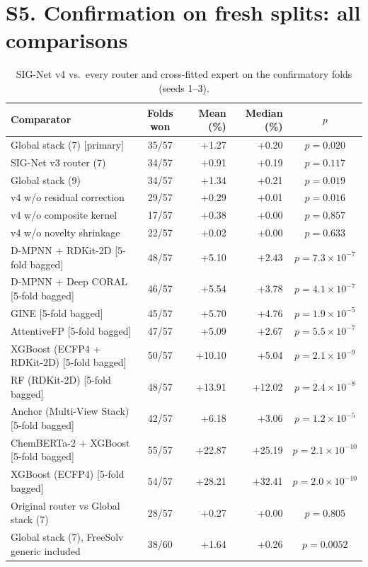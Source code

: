 \documentclass[11pt]{article}
\begin{document}
\section*{S5. Confirmation on fresh splits: all comparisons}
{\small
\begin{longtable}{lcrrc}
\caption{SIG-Net v4 vs.\ every router and cross-fitted expert on the confirmatory folds (seeds 1--3).}\\
\toprule
Comparator & Folds won & Mean (\%) & Median (\%) & $p$ \\
\midrule
Global stack (7) [primary] & 35/57 & +1.27 & +0.20 & $p = 0.020$ \\
SIG-Net v3 router (7) & 34/57 & +0.91 & +0.19 & $p = 0.117$ \\
Global stack (9) & 34/57 & +1.34 & +0.21 & $p = 0.019$ \\
v4 w/o residual correction & 29/57 & +0.29 & +0.01 & $p = 0.016$ \\
v4 w/o composite kernel & 17/57 & +0.38 & +0.00 & $p = 0.857$ \\
v4 w/o novelty shrinkage & 22/57 & +0.02 & +0.00 & $p = 0.633$ \\
D-MPNN + RDKit-2D [5-fold bagged] & 48/57 & +5.10 & +2.43 & $p = 7.3 \times 10^{-7}$ \\
D-MPNN + Deep CORAL [5-fold bagged] & 46/57 & +5.54 & +3.78 & $p = 4.1 \times 10^{-7}$ \\
GINE [5-fold bagged] & 45/57 & +5.70 & +4.76 & $p = 1.9 \times 10^{-5}$ \\
AttentiveFP [5-fold bagged] & 47/57 & +5.09 & +2.67 & $p = 5.5 \times 10^{-7}$ \\
XGBoost (ECFP4 + RDKit-2D) [5-fold bagged] & 50/57 & +10.10 & +5.04 & $p = 2.1 \times 10^{-9}$ \\
RF (RDKit-2D) [5-fold bagged] & 48/57 & +13.91 & +12.02 & $p = 2.4 \times 10^{-8}$ \\
Anchor (Multi-View Stack) [5-fold bagged] & 42/57 & +6.18 & +3.06 & $p = 1.2 \times 10^{-5}$ \\
ChemBERTa-2 + XGBoost [5-fold bagged] & 55/57 & +22.87 & +25.19 & $p = 2.1 \times 10^{-10}$ \\
XGBoost (ECFP4) [5-fold bagged] & 54/57 & +28.21 & +32.41 & $p = 2.0 \times 10^{-10}$ \\
Original router vs Global stack (7) & 28/57 & +0.27 & +0.00 & $p = 0.805$ \\
Global stack (7), FreeSolv generic included & 38/60 & +1.64 & +0.26 & $p = 0.0052$ \\
\bottomrule
\end{longtable}}
\end{document}
